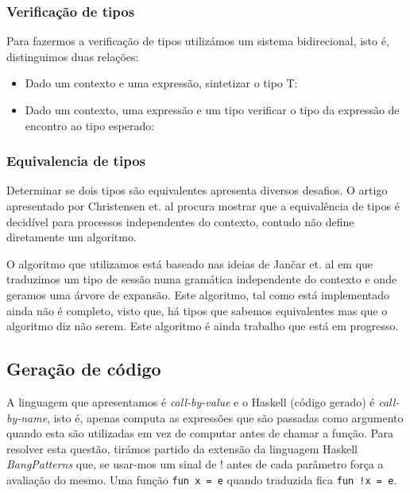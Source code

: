 \subsubsection{Verificação de tipos}
\label{sec:typecheck}
Para fazermos a verificação de tipos utilizámos um sistema bidirecional, isto é, distinguimos duas relações:
\begin{itemize}
\item Dado um contexto e uma expressão, sintetizar o tipo T: 
\item Dado um contexto, uma expressão e um tipo verificar o tipo da expressão de encontro ao tipo esperado:

\end{itemize}

\subsubsection{Equivalencia de tipos}

Determinar se dois tipos são equivalentes apresenta diversos desafios. O artigo apresentado por Christensen et. al \cite{decidable-CFP-bisimilarity} procura mostrar que a equivalência de tipos é decidível para processos independentes do contexto, contudo não define diretamente um algoritmo.

O algoritmo que utilizamos está baseado nas ideias de Jančar et. al \cite{bisimilarity} em que traduzimos um tipo de sessão numa gramática independente do contexto e onde geramos uma árvore de expansão. Este algoritmo, tal como está implementado ainda não é completo, visto que, há tipos que sabemos equivalentes mas que o algoritmo diz não serem. Este algoritmo é ainda trabalho que está em progresso.


\subsection{Geração de código}

A linguagem que apresentamos é \textit{call-by-value} e o Haskell (código gerado) é \textit{call-by-name}, isto é, apenas computa as expressões que são passadas como argumento quando esta são utilizadas em vez de computar antes de chamar a função. Para resolver esta questão, tirámos partido da extensão da linguagem Haskell \textit{BangPatterns} que, se usar-mos um sinal de ! antes de cada parâmetro força a avaliação do mesmo. Uma função \lstinline"fun x = e" quando traduzida fica \lstinline"fun !x = e".

